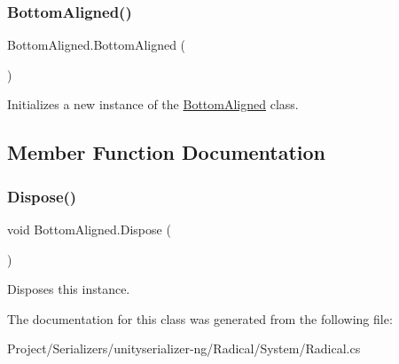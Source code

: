 \subsubsection{\texorpdfstring{Bottom\+Aligned()}{BottomAligned()}}
{\footnotesize\ttfamily Bottom\+Aligned.\+Bottom\+Aligned (\begin{DoxyParamCaption}{ }\end{DoxyParamCaption})\hspace{0.3cm}{\ttfamily [inline]}}



Initializes a new instance of the \hyperlink{class_bottom_aligned}{Bottom\+Aligned} class. 



\subsection{Member Function Documentation}
\mbox{\label{class_bottom_aligned_adcb96199970f967c2a4672830ba19508}} 
\subsubsection{\texorpdfstring{Dispose()}{Dispose()}}
{\footnotesize\ttfamily void Bottom\+Aligned.\+Dispose (\begin{DoxyParamCaption}{ }\end{DoxyParamCaption})\hspace{0.3cm}{\ttfamily [inline]}}



Disposes this instance. 



The documentation for this class was generated from the following file\+:\begin{DoxyCompactItemize}
\item 
Project/\+Serializers/unityserializer-\/ng/\+Radical/\+System/Radical.\+cs\end{DoxyCompactItemize}
